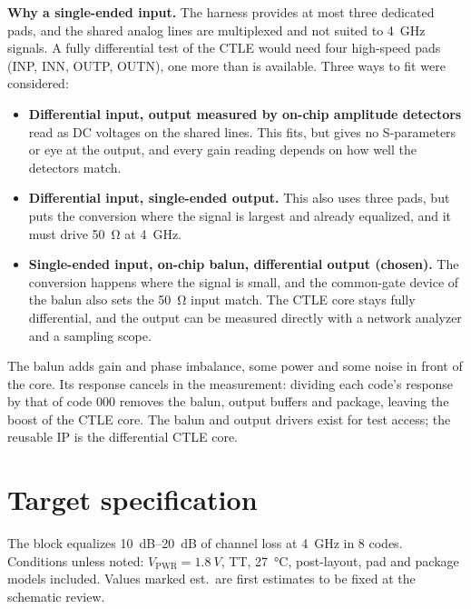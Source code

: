 \documentclass[11pt,a4paper]{article}
\begin{document}
\textbf{Why a single-ended input.} The harness provides at most three
dedicated pads, and the shared analog lines are multiplexed and not suited
to \SI{4}{GHz} signals. A fully differential test of the CTLE would need four
high-speed pads (INP, INN, OUTP, OUTN), one more than is available. Three
ways to fit were considered:
\begin{itemize}
\item \textbf{Differential input, output measured by on-chip amplitude
  detectors} read as DC voltages on the shared lines. This fits, but gives
  no S-parameters or eye at the output, and every gain reading depends on
  how well the detectors match.
\item \textbf{Differential input, single-ended output.} This also uses three
  pads, but puts the conversion where the signal is largest and already
  equalized, and it must drive \SI{50}{\ohm} at \SI{4}{GHz}.
\item \textbf{Single-ended input, on-chip balun, differential output
  (chosen).} The conversion happens where the signal is small, and the
  common-gate device of the balun also sets the \SI{50}{\ohm} input match.
  The CTLE core stays fully differential, and the output can be measured
  directly with a network analyzer and a sampling scope.
\end{itemize}
The balun adds gain and phase imbalance, some power and some noise in front
of the core. Its response cancels in the measurement: dividing each code's
response by that of code 000 removes the balun, output buffers and
package, leaving the boost of the CTLE core. The balun and output drivers exist
for test access; the reusable IP is the differential CTLE core.

\section{Target specification}
\label{sec:spec}

The block equalizes \SIrange{10}{20}{dB} of channel loss at \SI{4}{GHz} in
8 codes. Conditions unless noted: $V_\mathrm{PWR} =
\SI{1.8}{V}$, TT, \SI{27}{\celsius}, post-layout, pad and package models
included. Values marked est.\ are first estimates to be fixed at the
schematic review.
\end{document}
